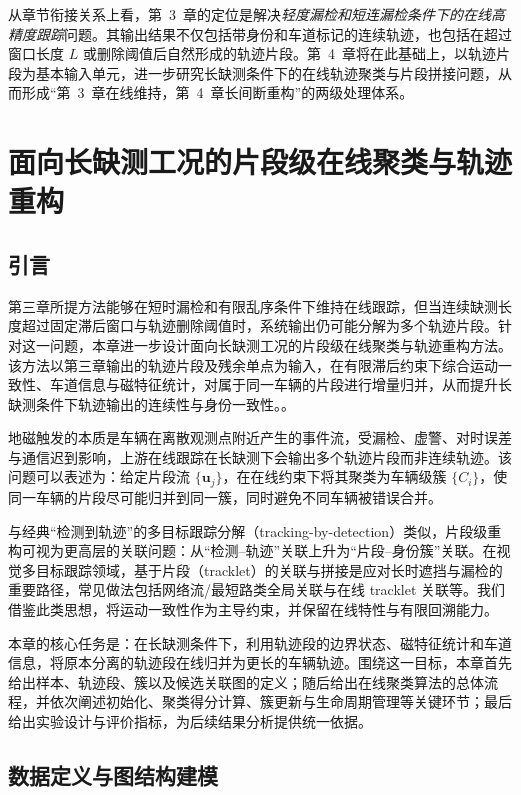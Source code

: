 \documentclass{xdupgthesis}
\begin{document}
从章节衔接关系上看，第~3~章的定位是解决\emph{轻度漏检和短连漏检条件下的在线高精度跟踪}问题。其输出结果不仅包括带身份和车道标记的连续轨迹，也包括在超过窗口长度 $L$ 或删除阈值后自然形成的轨迹片段。第~4~章将在此基础上，以轨迹片段为基本输入单元，进一步研究长缺测条件下的在线轨迹聚类与片段拼接问题，从而形成“第~3~章在线维持，第~4~章长间断重构”的两级处理体系。






\chapter{面向长缺测工况的片段级在线聚类与轨迹重构}
\label{chap:cedas_fragment}

\section*{引言}
第三章所提方法能够在短时漏检和有限乱序条件下维持在线跟踪，但当连续缺测长度超过固定滞后窗口与轨迹删除阈值时，系统输出仍可能分解为多个轨迹片段。针对这一问题，本章进一步设计面向长缺测工况的片段级在线聚类与轨迹重构方法。该方法以第三章输出的轨迹片段及残余单点为输入，在有限滞后约束下综合运动一致性、车道信息与磁特征统计，对属于同一车辆的片段进行增量归并，从而提升长缺测条件下轨迹输出的连续性与身份一致性。。

地磁触发的本质是车辆在离散观测点附近产生的事件流，受漏检、虚警、对时误差与通信迟到影响，上游在线跟踪在长缺测下会输出多个轨迹片段而非连续轨迹。该问题可以表述为：给定片段流 $\{\mathbf{u}_j\}$，在在线约束下将其聚类为车辆级簇 $\{C_i\}$，使同一车辆的片段尽可能归并到同一簇，同时避免不同车辆被错误合并。

与经典“检测到轨迹”的多目标跟踪分解（tracking-by-detection）类似，片段级重构可视为更高层的关联问题：从“检测--轨迹”关联上升为“片段--身份簇”关联。在视觉多目标跟踪领域，基于片段（tracklet）的关联与拼接是应对长时遮挡与漏检的重要路径，常见做法包括网络流/最短路类全局关联与在线 tracklet 关联等。我们借鉴此类思想，将运动一致性作为主导约束，并保留在线特性与有限回溯能力。

本章的核心任务是：在长缺测条件下，利用轨迹段的边界状态、磁特征统计和车道信息，将原本分离的轨迹段在线归并为更长的车辆轨迹。围绕这一目标，本章首先给出样本、轨迹段、簇以及候选关联图的定义；随后给出在线聚类算法的总体流程，并依次阐述初始化、聚类得分计算、簇更新与生命周期管理等关键环节；最后给出实验设计与评价指标，为后续结果分析提供统一依据。

\section{数据定义与图结构建模}
\end{document}
